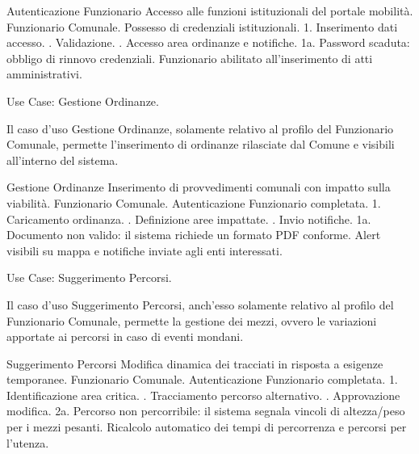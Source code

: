 \vspace{0.5cm}

\usecasetable
{Autenticazione Funzionario}
{Accesso alle funzioni istituzionali del portale mobilità.}
{Funzionario Comunale.}
{Possesso di credenziali istituzionali.}
{1. Inserimento dati accesso. . Validazione. . Accesso area ordinanze e notifiche.}
{1a. Password scaduta: obbligo di rinnovo credenziali.}
{Funzionario abilitato all'inserimento di atti amministrativi.}

\begin{center}
    Use Case: Gestione Ordinanze.
\end{center}
Il caso d'uso Gestione Ordinanze, solamente relativo al profilo del Funzionario Comunale, permette l'inserimento di ordinanze rilasciate dal Comune e visibili all'interno del sistema.

\vspace{0.5cm}

\usecasetable
{Gestione Ordinanze}
{Inserimento di provvedimenti comunali con impatto sulla viabilità.}
{Funzionario Comunale.}
{Autenticazione Funzionario completata.}
{1. Caricamento ordinanza. . Definizione aree impattate. . Invio notifiche.}
{1a. Documento non valido: il sistema richiede un formato PDF conforme.}
{Alert visibili su mappa e notifiche inviate agli enti interessati.}
\newpage

\begin{center}
    Use Case: Suggerimento Percorsi.
\end{center}
Il caso d'uso Suggerimento Percorsi, anch'esso solamente relativo al profilo del Funzionario Comunale, permette la gestione dei mezzi, ovvero le variazioni apportate ai percorsi in caso di eventi mondani.

\vspace{0.5cm}

\usecasetable
{Suggerimento Percorsi}
{Modifica dinamica dei tracciati in risposta a esigenze temporanee.}
{Funzionario Comunale.}
{Autenticazione Funzionario completata.}
{1. Identificazione area critica. . Tracciamento percorso alternativo. . Approvazione modifica.}
{2a. Percorso non percorribile: il sistema segnala vincoli di altezza/peso per i mezzi pesanti.}
{Ricalcolo automatico dei tempi di percorrenza e percorsi per l'utenza.}

